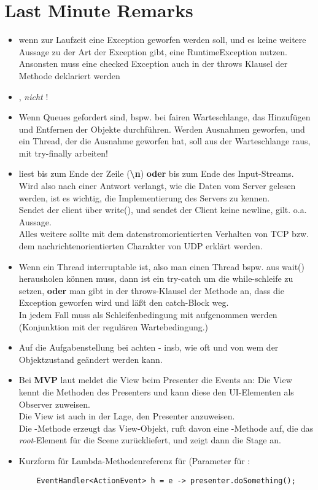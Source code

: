 \section{Last Minute Remarks}

\begin{itemize}
    \item wenn zur Laufzeit eine Exception geworfen werden soll, und es keine weitere Aussage zu der Art der Exception gibt, eine RuntimeException nutzen.
    Ansonsten muss eine checked Exception auch in der throws Klausel der Methode deklariert werden
    \item {}, \textit{nicht} !
    \item Wenn Queues gefordert sind, bspw. bei fairen Warteschlange, das Hinzufügen und Entfernen der Objekte durchführen.
    Werden Ausnahmen geworfen, und ein Thread, der die Ausnahme geworfen hat, soll aus der Warteschlange raus, mit try-finally arbeiten!
    \item {} liest bis zum Ende der Zeile (\textbf{\textbackslash{n}}) \textbf{oder} bis zum Ende des Input-Streams.
    Wird also nach einer Antwort verlangt, wie die Daten vom Server gelesen werden, ist es wichtig, die Implementierung des Servers zu kennen.\\
    Sendet der client über write(), und sendet der Client keine newline, gilt. o.a. Aussage.\\
    Alles weitere sollte mit dem datenstromorientierten Verhalten von TCP bzw. dem nachrichtenorientierten Charakter von UDP erklärt werden.
    \item Wenn ein Thread interruptable ist, also man einen Thread bspw. aus wait() herausholen können muss, dann ist ein try-catch um die while-schleife zu setzen, \textbf{oder} man gibt in der throws-Klausel der Methode an, dass die Exception geworfen wird und läßt den catch-Block weg.\\
    In jedem Fall muss als Schleifenbedingung  mit aufgenommen werden (Konjunktion mit der regulären Wartebedingung.)
    \item Auf die Aufgabenstellung bei  achten - insb, wie oft und von wem der Objektzustand geändert werden kann.
    \item Bei \textbf{MVP} laut \cite[227 f. Listing 4.8]{Oec22} meldet die View beim Presenter die Events an: Die View kennt die Methoden des Presenters und kann diese den UI-Elementen als Observer zuweisen.\\
    Die View ist auch in der Lage, den Presenter anzuweisen.\\
    Die -Methode erzeugt das View-Objekt, ruft davon eine -Methode auf, die das \textit{root}-Element für die Scene zurückliefert, und zeigt dann die Stage an.
    \item Kurzform für Lambda-Methodenreferenz für  (Parameter für :\\
    \begin{verbatim}
    EventHandler<ActionEvent> h = e -> presenter.doSomething();
    \end{verbatim}
\end{itemize}